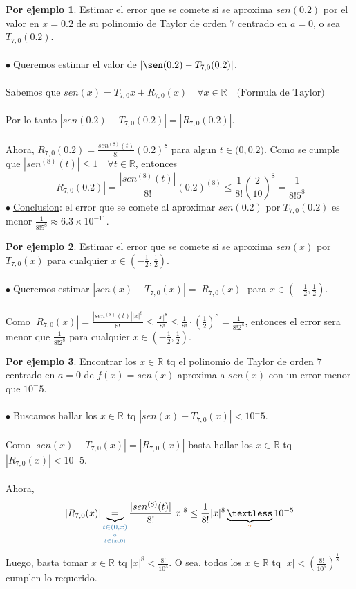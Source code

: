 \documentclass{article}
\theoremstyle{definition}
\theoremstyle{definition}
\newtheorem*{ej}{Por ejemplo}
\theoremstyle{remark}
\newcommand\bl{$\bullet\;$}
\begin{document}
\begin{ej}
  Estimar el error que se comete si se aproxima $sen(0.2)$ por el valor en $x=0.2$ de su polinomio de Taylor de orden $7$ centrado en $a=0$, o sea $T_{7,0}(0.2)$. \\ \\ 
  \bl Queremos estimar el valor de $|\sen(0.2)-T_{7,0}(0.2)|$. \\\\ Sabemos que $sen(x)=T_{7,0}{x}+R_{7,0}(x) \quad \forall x \in \mathbb{R} \quad \big(\text{Formula de Taylor}\big)$ \\\\ Por lo tanto $|sen(0.2)-T_{7,0}(0.2)|=|R_{7,0}(0.2)|$. \\ \\Ahora, $R_{7,0}(0.2)=\frac{sen^{(8)}(t)}{8!}(0.2)^8$ para algun $t \in \big(0,0.2\big)$. Como se cumple que $|sen^{(8)}(t)|\leq 1 \quad \forall t \in \mathbb{R}$, entonces \[ 
    |R_{7,0}(0.2)|=\frac{|sen^{(8)}(t)|}{8!}(0.2)^{(8)} \leq \frac{1}{8!}\left(\frac{2}{10}\right)^8 = \frac{1}{8!5^8}
\]
\bl \underline{Conclusion}: el error que se comete al aproximar $sen(0.2)$ por $T_{7,0}(0.2)$ es menor $\frac{1}{8!5^8} \approx 6.3\times10^{-11}$.
\end{ej}
\begin{ej}
  Estimar el error que se comete si se aproxima $sen(x)$ por $T_{7,0}(x)$ para cualquier $x \in \left(-\frac{1}{2},\frac{1}{2}\right)$. \\ \\
  \bl Queremos estimar $|sen(x)-T_{7,0}(x)|=|R_{7,0}(x)|$ para $x \in \left(-\frac{1}{2},\frac{1}{2}\right)$.
  \\\\
  Como $|R_{7,0}(x)|=\frac{|sen^{(8)}(t)||x|^8}{8!} \leq \frac{|x|^8}{8!} \leq \frac{1}{8!} \cdot\left(\frac{1}{2}\right)^8 = \frac{1}{8!2^8}$, entonces el error sera menor que $\frac{1}{8!2^8}$ para cualquier $x \in \left(-\frac{1}{2},\frac{1}{2}\right)$.
\end{ej}\pagebreak
\begin{ej}
  Encontrar los $x \in \mathbb{R}$ tq el polinomio de Taylor de orden $7$ centrado en $a=0$ de $f(x)=sen(x)$ aproxima a $sen(x)$ con un error menor que $10^-5$. \\\\
  \bl Buscamos hallar los $x \in \mathbb{R}$ tq $|sen(x)-T_{7,0}(x)|<10^-5$.\\\\
  Como $|sen(x)-T_{7,0}(x)|=|R_{7,0}(x)|$ basta hallar los $x \in \mathbb{R}$ tq $|R_{7,0}(x)| < 10^-5$. \\\\
  Ahora, \[
  |R_{7,0}(x)| \underbrace{=}_{\textcolor{azulp2}{\underset{\underset{t \in (x,0)}{\text{o}}}{t \in (0,x)}}} \frac{|sen^{(8)}(t)|}{8!} |x|^8 \leq \frac{1}{8!}|x|^8 \underbrace{\textless}_{\textcolor{rojop2}{?}} 10^{-5}
\]
Luego, basta tomar $x \in \mathbb{R}$ tq $|x|^8 < \frac{8!}{10^5}$. O sea, todos los $x \in \mathbb{R}$ tq $|x| < \left(\frac{8!}{10^5}\right)^{\frac{1}{8}}$ cumplen lo requerido.
\end{ej}
\end{document}
